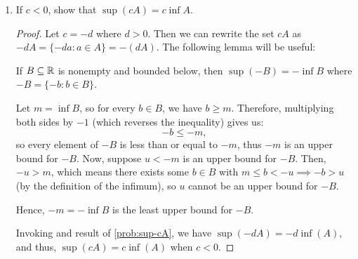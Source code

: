 \begin{problem}
\begin{enumerate}[label=(\alph*)]
\begin{proof}
        When $c > 0$, let us suppose for sake of contradiction that $cs$ is not the \textit{least} upper bound for $cA$. 
        This means $b = \sup(cA) < cs$ for some $b \in \R$. First, consider when $c > 0$. Dividing through by $c > 0$ gives us:
        \[
          \frac{b}{c} < s,
        \]
        so there exists some $a \in A$ such that:
        \[
          a > \frac{b}{c} \implies ca > b.
        \]
        However, a contradiction is reached because $ca \in cA$ and $b$ is supposed to be an upper bound for $cA$.

        Now consider the case when $c = 0$. In this case, $cA = \{0\}$, and thus $\sup(cA) = 0 = cs$. 

        Therefore, in both cases, we conclude that $cs$ is indeed the least upper bound for $cA$.
      \end{proof}

    \item If $c < 0$, show that $\sup(cA) = c \inf A$. \label{prob:sup-cA-negative}

      \begin{proof}

        Let $c = -d$ where $d > 0$. Then we can rewrite the set $cA$ as $-dA = \{-da : a \in A\} = -(dA)$. The following lemma will be useful:

        \begin{lemma} \label{lem:sup-neg-bounded}
          If $B \subseteq \mathbb{R}$ is nonempty and bounded below, then $\sup(-B) = -\inf B$ where $-B = \{-b : b \in B\}$.
        \end{lemma}

        \begin{subproof}
          Let $m = \inf B$, so for every $b \in B$, we have $b \geq m$. Therefore, multiplying both sides by $-1$ (which reverses the inequality) 
          gives us:
          \[
            -b \leq -m,
          \]
          so every element of $-B$ is less than or equal to $-m$, thus $-m$ is an upper bound for $-B$. Now, suppose $u < -m$ is an upper bound for $-B$. 
          Then,  $-u > m$, which means there exists some $b \in B$ with $m \leq b < -u \implies -b > u$ (by the definition of the infimum), so $u$ cannot be an upper bound for $-B$.

          Hence, $-m = -\inf B$ is the least upper bound for $-B$. 
        \end{subproof}

        Invoking  and result of \ref{prob:sup-cA}, we have $\sup(-dA) = -d \inf(A)$, and thus, $\sup(cA) = c \inf(A)$ when $c < 0$. 

      \end{proof}

  \end{enumerate}
\end{problem}

